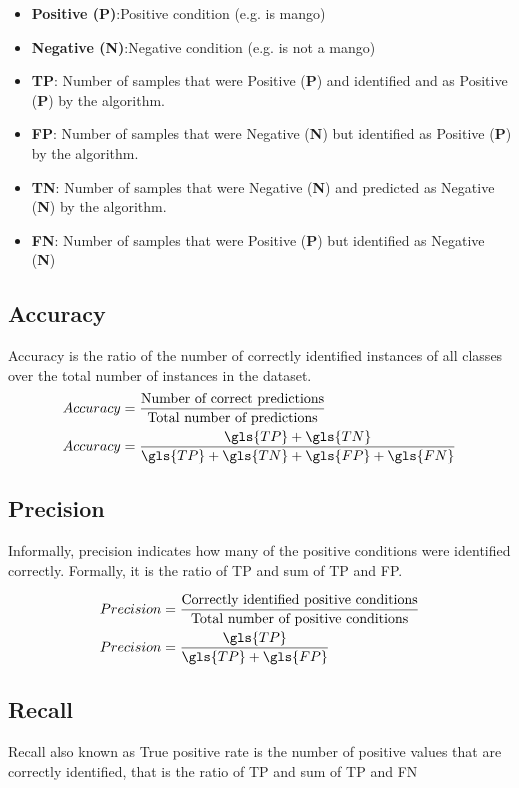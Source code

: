 \begin{itemize}
    \item \textbf{Positive (P)}:Positive condition (e.g. is mango)
    \item \textbf{Negative (N)}:Negative condition (e.g. is not a mango)
    \item \textbf{\gls{TP}}: Number of samples that were Positive  (\textbf{P}) and identified and as Positive (\textbf{P}) by the algorithm.
    \item \textbf{\gls{FP}}: Number of samples that were Negative (\textbf{N}) but identified as Positive  (\textbf{P}) by the algorithm.
    \item \textbf{\gls{TN}}: Number of samples that were Negative (\textbf{N}) and predicted as Negative (\textbf{N}) by the algorithm.
    \item \textbf{\gls{FN}}: Number of samples that were Positive (\textbf{P}) but identified as Negative (\textbf{N})
\end{itemize}


\subsection*{Accuracy}
Accuracy is the ratio of the number of correctly identified instances of all classes over the total number of instances in the dataset. 
\begin{align}
    Accuracy &= \frac{\text{Number of correct predictions}}{\text{Total number of predictions}}\\
    Accuracy &= \frac{\gls{TP}+\gls{TN}}{\gls{TP}+\gls{TN}+\gls{FP}+\gls{FN}}
\end{align}

\subsection*{Precision}
Informally, precision indicates how many of the positive conditions were identified correctly. Formally, it is the ratio of \gls{TP} and sum of \gls{TP} and \gls{FP}.

\begin{align}
    Precision &= \frac{\text{Correctly identified positive conditions}}{\text{Total number of positive conditions}}\\
    Precision &= \frac{\gls{TP}}{\gls{TP}+\gls{FP}}
\end{align}

\subsection*{Recall}
Recall also known as True positive rate is the number of positive values that are correctly identified, that is the ratio of \gls{TP} and sum of \gls{TP} and \gls{FN}


